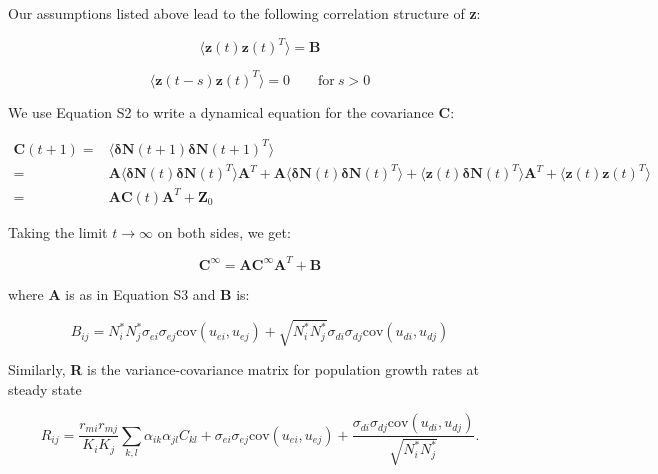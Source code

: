 \documentclass[12pt,]{article}
\begin{document}
Our assumptions listed above lead to the following correlation structure
of \textbf{z}:

\begin{equation}
\big\langle \textbf{z}(t) \textbf{z}(t)^T \big\rangle = \textbf{B}
\end{equation}

\begin{equation}
\big\langle \textbf{z}(t-s) \textbf{z}(t)^T \big\rangle = 0 \qquad \text{for} \: s>0
\end{equation}

We use Equation S2 to write a dynamical equation for the covariance
\textbf{C}:

\begin{footnotesize}
\begin{align}
\textbf{C}(t+1) =& \big\langle \boldsymbol{\delta}\textbf{N}(t+1) \boldsymbol{\delta}\textbf{N}(t+1)^T \big\rangle \\
=& \textbf{A}\big\langle \boldsymbol{\delta}\textbf{N}(t) \boldsymbol{\delta}\textbf{N}(t)^T \big\rangle \textbf{A}^T + \textbf{A}\big\langle \boldsymbol{\delta}\textbf{N}(t) \boldsymbol{\delta}\textbf{N}(t)^T \big\rangle + \big\langle \textbf{z}(t) \boldsymbol{\delta}\textbf{N}(t)^T \big\rangle \textbf{A}^T + \big\langle \textbf{z}(t) \textbf{z}(t)^T \big\rangle \\
=& \textbf{A} \textbf{C}(t) \textbf{A}^T + \textbf{Z}_0
\end{align}
\end{footnotesize}

\noindent Taking the limit \(t \rightarrow \infty\) on both sides, we
get:

\begin{equation}
\textbf{C}^\infty = \textbf{A} \textbf{C}^\infty \textbf{A}^T + \textbf{B}
\end{equation}

\noindent where \textbf{A} is as in Equation S3 and \textbf{B} is:

\begin{equation}
B_{ij} = N_{i}^* N_{j}^* \sigma_{ei} \sigma_{ej} \text{cov}(u_{ei},u_{ej}) + \sqrt{N_{i}^* N_{j}^*} \sigma_{di}\sigma_{dj} \text{cov}(u_{di},u_{dj})
\end{equation}

\noindent Similarly, \textbf{R} is the variance-covariance matrix for
population growth rates at steady state

\begin{equation}
R_{ij} = \frac{r_{mi}r_{mj}}{K_i K_j} \sum_{k,l} \alpha_{ik} \alpha_{jl} C_{kl} + \sigma_{ei} \sigma_{ej} \text{cov}(u_{ei},u_{ej}) + \frac{\sigma_{di}\sigma_{dj} \text{cov}(u_{di},u_{dj})}{\sqrt{N_{i}^* N_{j}^*}}.
\end{equation}
\end{document}
